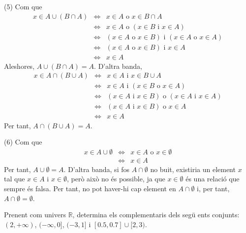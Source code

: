 \begin{solucio}
(5) Com que
\begin{equation*}
\begin{array}{lll}
x\in A\cup (B\cap A) & \Longleftrightarrow & x\in A\text{ o }x\in B\cap A \\
& \Longleftrightarrow & x\in A\text{ o }\left( x\in B\text{ i }x\in A\right)
\\
& \Longleftrightarrow & \left( x\in A\text{ o }x\in B\right) \text{ i }%
\left( x\in A\text{ o }x\in A\right) \\
& \Longleftrightarrow & \left( x\in A\text{ o }x\in B\right) \text{ i }x\in A
\\
& \Longleftrightarrow & x\in A%
\end{array}%
\end{equation*}%
Aleshores, $A\cup (B\cap A)=A$. D'altra banda,%
\begin{equation*}
\begin{array}{lll}
x\in A\cap (B\cup A) & \Longleftrightarrow & x\in A\text{ i }x\in B\cup A \\
& \Longleftrightarrow & x\in A\text{ i }\left( x\in B\text{ o }x\in A\right)
\\
& \Longleftrightarrow & \left( x\in A\text{ i }x\in B\right) \text{ o }%
\left( x\in A\text{ i }x\in A\right) \\
& \Longleftrightarrow & \left( x\in A\text{ i }x\in B\right) \text{ o }x\in A
\\
& \Longleftrightarrow & x\in A%
\end{array}%
\end{equation*}%
Per tant, $A\cap (B\cup A)=A$.

(6) Com que%
\begin{equation*}
\begin{array}{lll}
x\in A\cup \emptyset & \Longleftrightarrow & x\in A\text{ o }x\in \emptyset
\\
& \Longleftrightarrow & x\in A%
\end{array}%
\end{equation*}%
Per tant, $A\cup \emptyset =A$. D'altra banda, si fos $A\cap \emptyset $ no
buit, existiria un element $x$ tal que $x\in A$ i $x\in \emptyset $, per\`{o}
aix\`{o} no \'{e}s possible, ja que $x\in \emptyset $ \'{e}s una relaci\'{o}
que sempre \'{e}s falsa. Per tant, no pot haver-hi cap element en $A\cap
\emptyset $ i, per tant, $A\cap \emptyset =\emptyset $.
\end{solucio}

\begin{exercici}
Prenent com univers $\mathbb{R}$, determina els complementaris dels seg\"{u}%
ents conjunts: $(2,+\infty )$, $(-\infty ,0]$, $(-3,1]$ i $[0.5,0.7]\cup
\lbrack 2,3)$.
\end{exercici}

